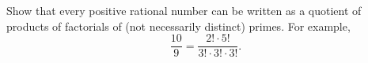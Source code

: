 Show that every positive rational number can be written as a quotient of products of factorials
of (not necessarily distinct) primes. For example,
\[
\frac{10}{9} = \frac{2!\cdot 5!}{3!\cdot 3! \cdot 3!}.
\]
\,
